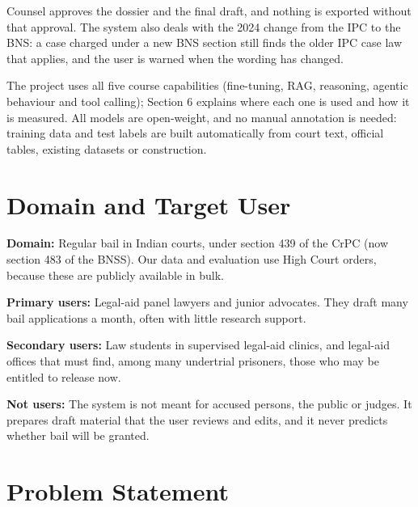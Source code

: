 \documentclass[10pt,a4paper]{article}
\begin{document}
Counsel approves the dossier and the final draft, and nothing is exported without that approval. The system also deals with the 2024 change from the IPC to the BNS: a case charged under a new BNS section still finds the older IPC case law that applies, and the user is warned when the wording has changed.

The project uses all five course capabilities (fine-tuning, RAG, reasoning, agentic behaviour and tool calling); Section 6 explains where each one is used and how it is measured. All models are open-weight, and no manual annotation is needed: training data and test labels are built automatically from court text, official tables, existing datasets or construction.

\section{Domain and Target User}

\textbf{Domain:} Regular bail in Indian courts, under section 439 of the CrPC (now section 483 of the BNSS). Our data and evaluation use High Court orders, because these are publicly available in bulk.

\textbf{Primary users:} Legal-aid panel lawyers and junior advocates. They draft many bail applications a month, often with little research support.

\textbf{Secondary users:} Law students in supervised legal-aid clinics, and legal-aid offices that must find, among many undertrial prisoners, those who may be entitled to release now.

\textbf{Not users:} The system is not meant for accused persons, the public or judges. It prepares draft material that the user reviews and edits, and it never predicts whether bail will be granted.

\section{Problem Statement}
\end{document}

